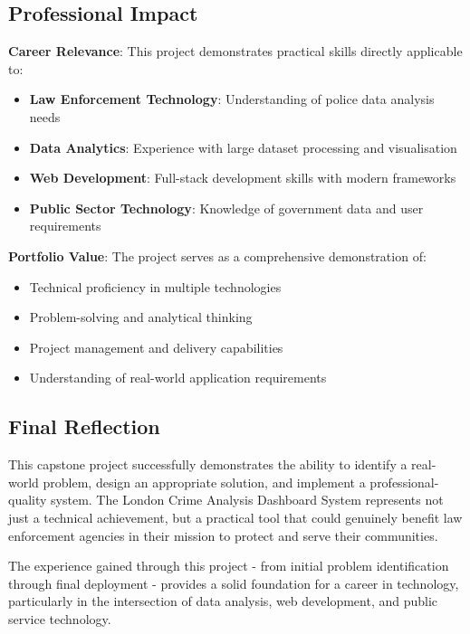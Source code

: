 \documentclass[12pt,a4paper]{article}
\begin{document}
\subsection{Professional Impact}

\textbf{Career Relevance}:
This project demonstrates practical skills directly applicable to:
\begin{itemize}
    \item \textbf{Law Enforcement Technology}: Understanding of police data analysis needs
    \item \textbf{Data Analytics}: Experience with large dataset processing and visualisation
    \item \textbf{Web Development}: Full-stack development skills with modern frameworks
    \item \textbf{Public Sector Technology}: Knowledge of government data and user requirements
\end{itemize}

\textbf{Portfolio Value}:
The project serves as a comprehensive demonstration of:
\begin{itemize}
    \item Technical proficiency in multiple technologies
    \item Problem-solving and analytical thinking
    \item Project management and delivery capabilities
    \item Understanding of real-world application requirements
\end{itemize}

\subsection{Final Reflection}

This capstone project successfully demonstrates the ability to identify a real-world problem, design an appropriate solution, and implement a professional-quality system. The London Crime Analysis Dashboard System represents not just a technical achievement, but a practical tool that could genuinely benefit law enforcement agencies in their mission to protect and serve their communities.

The experience gained through this project - from initial problem identification through final deployment - provides a solid foundation for a career in technology, particularly in the intersection of data analysis, web development, and public service technology.
\end{document}

